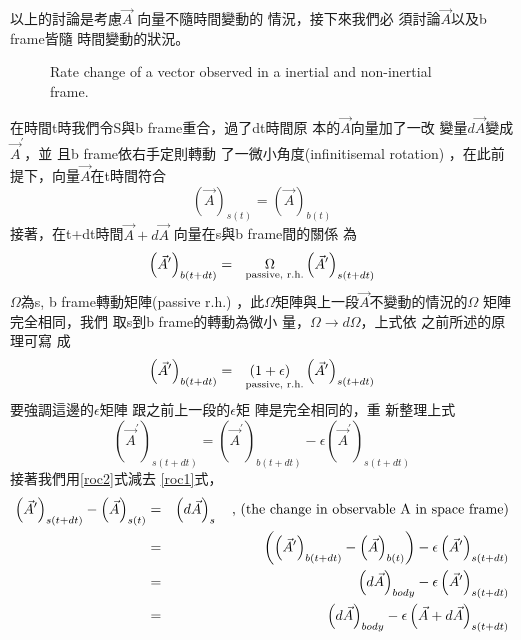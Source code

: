 \documentclass{article}
\begin{document}
以上的討論是考慮$\vec{A}$%
向量不隨時間變動的%
情況，接下來我們必%
須討論$\vec{A}$以及b frame皆隨%
時間變動的狀況。

\bigskip 
\begin{figure}[th]
\caption{Rate change of a vector observed in a inertial and non-inertial
frame.}
\label{ratevecfig}
\begin{center}
\fbox{}
\end{center}
\end{figure}

\bigskip 在時間t時我們令S與b
frame重合，過了dt時間原%
本的$\vec{A}$向量加了一改%
變量$d\vec{A}$變成$\vec{A}^{\prime }$，並%
且b frame依右手定則轉動%
了一微小角度(infinitisemal rotation)%
，在此前提下，向量$%
\vec{A}$在t時間符合%
\begin{equation}
\left( \vec{A}\right) _{s(t)}=\left( \vec{A}\right) _{b(t)}  \label{roc1}
\end{equation}%
接著，在t+dt時間$\vec{A}+d\vec{A}$%
向量在s與b frame間的關係%
為%
\begin{equation*}
\left( \vec{A}^{\prime }\right) _{b(t+dt)}=\underset{\text{passive, r.h.}}{%
\Omega }\left( \vec{A}^{\prime }\right) _{s(t+dt)}
\end{equation*}%
$\Omega $為s, b frame轉動矩陣(passive r.h.)%
，此$\Omega $矩陣與上一段$%
\vec{A}$不變動的情況的$\Omega $%
矩陣完全相同，我們%
取s到b frame的轉動為微小%
量，$\Omega \rightarrow d\Omega $，上式依%
之前所述的原理可寫%
成%
\begin{equation*}
\left( \vec{A}^{\prime }\right) _{b(t+dt)}=\underset{\text{passive, r.h.}}{%
\left( 1+\epsilon \right) }\left( \vec{A}^{\prime }\right) _{s(t+dt)}
\end{equation*}%
要強調這邊的$\epsilon $矩陣%
跟之前上一段的$\epsilon $矩%
陣是完全相同的，重%
新整理上式%
\begin{equation}
\left( \vec{A}^{\prime }\right) _{s(t+dt)}=\left( \vec{A}^{\prime }\right)
_{b(t+dt)}-\epsilon \left( \vec{A}^{\prime }\right) _{s(t+dt)}  \label{roc2}
\end{equation}%
接著我們用\ref{roc2}式減去%
\ref{roc1}式，%
\begin{eqnarray}
\left( \vec{A}^{\prime }\right) _{s(t+dt)}-\left( \vec{A}\right) _{s(t)}
&=&\left( d\vec{A}\right) _{s}\text{ , (the change in observable A in space
frame)}  \notag \\
&=&\left( \left( \vec{A}^{\prime }\right) _{b(t+dt)}-\left( \vec{A}\right)
_{b(t)}\right) -\epsilon \left( \vec{A}^{\prime }\right) _{s(t+dt)}  \notag
\\
&=&\left( d\vec{A}\right) _{body}-\epsilon \left( \vec{A}^{\prime }\right)
_{s(t+dt)}  \notag \\
&=&\left( d\vec{A}\right) _{body}-\epsilon \left( \vec{A}+d\vec{A}\right)
_{s(t+dt)}  \label{roc4}
\end{eqnarray}%
\end{document}
